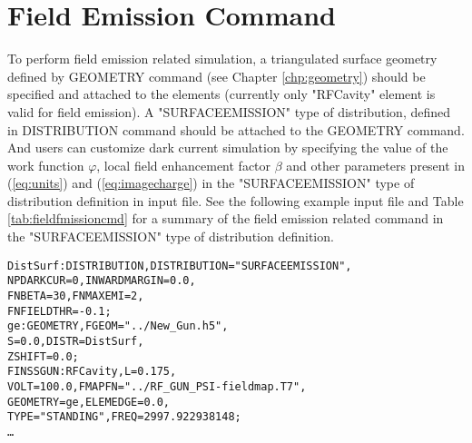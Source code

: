 \section{Field Emission Command}
\label{sec:FieldEmissionCmd}
To perform field emission related simulation, a triangulated surface geometry defined by GEOMETRY command (see  Chapter \ref{chp:geometry})  should be specified and attached to the elements (currently only "RFCavity" element is valid for field emission). A "SURFACEEMISSION" type of distribution, defined in DISTRIBUTION command should be attached to the GEOMETRY command. And users can customize dark current simulation by specifying the value of the work
function $\varphi$, local field enhancement factor $\beta$ and other parameters
present in (\ref{eq:units}) and (\ref{eq:imagecharge}) in the "SURFACEEMISSION" type of distribution definition in input file. See the following example input file and Table \ref{tab:fieldfmissioncmd} for a summary of the field emission related command in the "SURFACEEMISSION" type of distribution definition.\\
\begin{alltt}
DistSurf: DISTRIBUTION, DISTRIBUTION = "SURFACEEMISSION", 
          NPDARKCUR = 0, INWARDMARGIN=0.0, 
          FNBETA = 30, FNMAXEMI = 2,  
          FNFIELDTHR = -0.1;
ge:       GEOMETRY, FGEOM="../New_Gun.h5", 
          S=0.0, DISTR=DistSurf, 
          ZSHIFT=0.0; 
FINSSGUN: RFCavity, L = 0.175, 
          VOLT = 100.0, FMAPFN = "../RF_GUN_PSI-fieldmap.T7" , 
          GEOMETRY = ge, ELEMEDGE =0.0, 
          TYPE = "STANDING", FREQ = 2997.922938148;
\ldots
\end{alltt}


